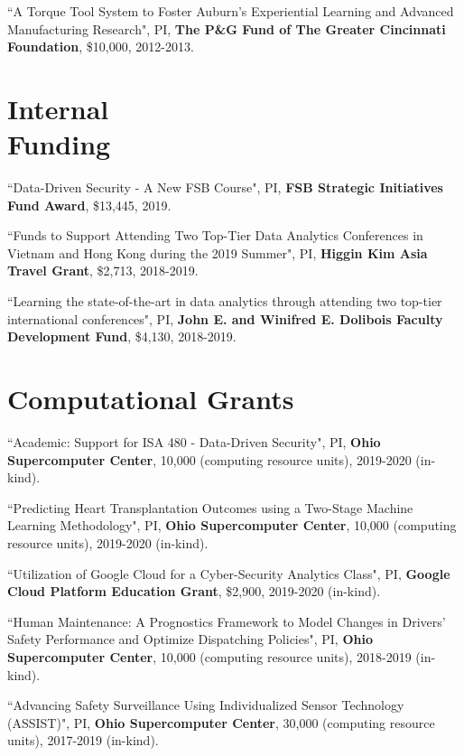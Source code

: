 \documentclass[margin,line]{res}
\begin{document}
\begin{resume}
\vspace{-1.5mm}
``A Torque Tool System to Foster Auburn's Experiential Learning and Advanced Manufacturing Research", PI, \textbf{The P\&G Fund of The Greater Cincinnati Foundation}, \$10,000, 2012-2013.

\section{\sc Internal \\ Funding}
``Data-Driven Security - A New FSB Course", PI, \textbf{FSB Strategic Initiatives Fund Award}, \$13,445, 2019.

\vspace{-1.5mm}
``Funds to Support Attending Two Top-Tier Data Analytics Conferences in Vietnam and Hong Kong during the 2019 Summer", PI, \textbf{Higgin Kim Asia Travel Grant}, \$2,713, 2018-2019.

\vspace{-1.5mm}
``Learning the state-of-the-art in data analytics through attending two top-tier    international conferences", PI, \textbf{John E. and Winifred E. Dolibois Faculty Development Fund}, \$4,130, 2018-2019.

\section{\sc Computational Grants}

``Academic: Support for ISA 480 - Data-Driven Security", PI, \textbf{Ohio Supercomputer Center}, 10,000 (computing resource units), 2019-2020 (in-kind).

\vspace{-1.5mm}

``Predicting Heart Transplantation Outcomes using a Two-Stage Machine Learning Methodology", PI, \textbf{Ohio Supercomputer Center}, 10,000 (computing resource units), 2019-2020 (in-kind).

\vspace{-1.5mm}
``Utilization of Google Cloud for a Cyber-Security Analytics Class", PI, \textbf{Google Cloud Platform Education Grant}, \$2,900, 2019-2020 (in-kind).

\vspace{-1.5mm}
``Human Maintenance: A Prognostics Framework to Model Changes in Drivers' Safety Performance and Optimize Dispatching Policies", PI, \textbf{Ohio Supercomputer Center}, 10,000 (computing resource units), 2018-2019 (in-kind).

\vspace{-1.5mm}
``Advancing Safety Surveillance Using Individualized Sensor Technology (ASSIST)", PI, \textbf{Ohio Supercomputer Center}, 30,000 (computing resource units), 2017-2019 (in-kind).


\end{resume}
\end{document}
